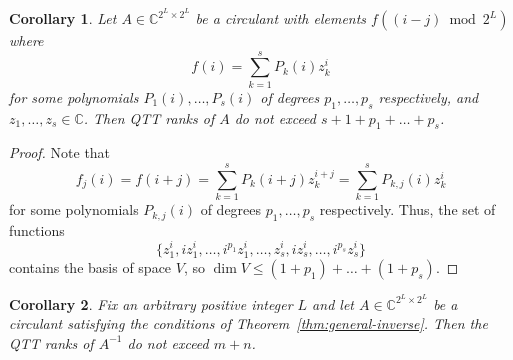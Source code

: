 \documentclass[a4paper]{article}
\newtheorem{corollary}{Corollary}[section]
\newcommand{\LL}{L}
\newcommand{\base}{2}
\begin{document}
    
	\begin{corollary}\label{cor:qtt-ranks-special-circulant}
		Let $A \in \mathbb{C}^{\base^\LL \times \base^\LL}$ be a circulant with elements $f((i-j) \bmod \base^\LL)$ where \[
			f(i) = \sum_{k=1}^s P_k(i) z_k^i
		\]
		for some polynomials $P_1(i),\dots,P_s(i)$ of degrees $p_1, \dots, p_s$ respectively, and $z_1, \dots, z_s \in \mathbb{C}$.
		Then QTT ranks of $A$ do not exceed $s + 1 + p_1 + \dots + p_s$.
	\end{corollary}
	\begin{proof}
		Note that
		\[
		f_j(i) = f(i+j) = \sum_{k=1}^s P_k(i+j)z_k^{i+j} = \sum_{k=1}^s P_{k,j}(i)z_k^{i}
		\]
		for some polynomials $P_{k,j}(i)$ of degrees $p_1,\dots,p_s$ respectively.
		Thus, the set of functions
		\[
		\{z_1^i,iz_1^i,\dots,i^{p_1}z_1^i,\dots,z_s^i,iz_s^i,\dots, i^{p_s}z_s^i\}
		\]
		contains the basis of space $V$, so $\dim V \le (1+p_1)+\dots+(1+p_s)$.
	\end{proof}
	\begin{corollary}
		Fix an arbitrary positive integer $\LL$ and let $A \in \mathbb{C}^{\base^\LL \times \base^\LL}$ be a circulant satisfying the conditions of Theorem~\ref{thm:general-inverse}.
		Then the QTT ranks of $A^{-1}$ do not exceed $m+n$.
	\end{corollary}
\end{document}

